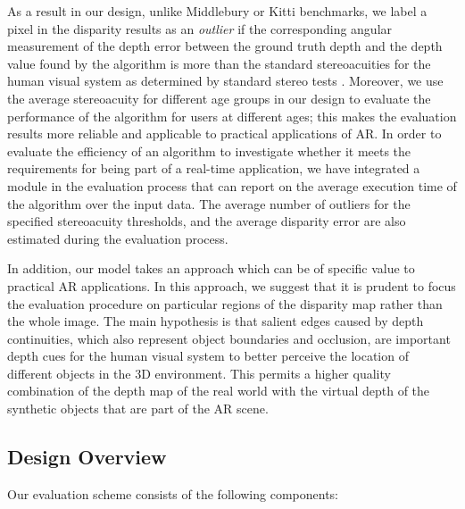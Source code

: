 
As a result in our design, unlike Middlebury or Kitti benchmarks, we label a pixel in the disparity results as an \textit{outlier} if the corresponding angular
measurement of the depth error between the ground truth depth and the depth value found by the algorithm is more than the standard stereoacuities
for the human visual system as determined
by standard stereo tests \cite{binr83,garn06}. 
Moreover, we use the average stereoacuity for different age groups \cite{garn06} in our design to evaluate the performance of the algorithm for users 
at different ages; this makes the evaluation results more reliable and applicable to practical applications of AR.
In order to evaluate the efficiency of an algorithm to investigate whether it meets the requirements for being part of a real-time application, 
we have integrated a module in the evaluation process that can report on the average execution time of the algorithm over the input data.
The average number of outliers for the specified stereoacuity thresholds, and the average disparity error are also estimated during the evaluation process.

In addition, our model takes an approach which can be of specific value to practical AR applications. In this approach, we suggest that
it is prudent to focus the evaluation procedure on particular regions of the disparity map rather than the whole image. The main hypothesis
is that salient edges caused by depth continuities, which also represent object boundaries and occlusion, are important depth cues for the human
visual system to better perceive the location of different objects in the 3D environment.
This permits a higher quality combination of the depth map of the real world with the virtual depth of the synthetic objects that are part of the AR scene.

\subsection{Design Overview}

Our evaluation scheme consists of the following components:

